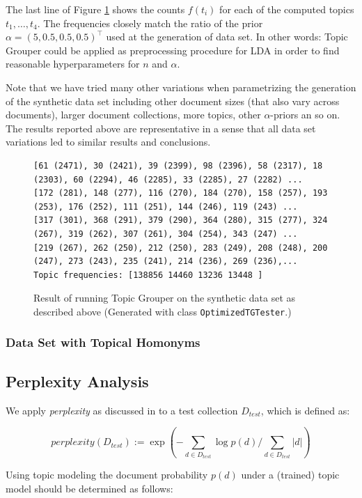 \documentclass[10pt, a4paper, oneside]{article}
\begin{document}
The last line of Figure \ref{tgresult} shows the counts $f(t_i)$ for each of the computed topics $t_1,\ldots,t_4$. The frequencies closely match the ratio of the prior $\alpha = (5, 0.5, 0.5, 0.5)^\top$ used at the generation of data set. In other words: Topic Grouper could be applied as preprocessing procedure for LDA in order to find reasonable hyperparameters for $n$ and $\alpha$.

Note that we have tried many other variations when parametrizing the generation of the synthetic data set including other document sizes (that also vary across documents), larger document collections, more topics, other $\alpha$-priors an so on. The results reported above are representative in a sense that all data set variations led to similar results and conclusions.

\begin{figure}
{\tiny
\begin{verbatim}
[61 (2471), 30 (2421), 39 (2399), 98 (2396), 58 (2317), 18 (2303), 60 (2294), 46 (2285), 33 (2285), 27 (2282) ...
[172 (281), 148 (277), 116 (270), 184 (270), 158 (257), 193 (253), 176 (252), 111 (251), 144 (246), 119 (243) ...
[317 (301), 368 (291), 379 (290), 364 (280), 315 (277), 324 (267), 319 (262), 307 (261), 304 (254), 343 (247) ...
[219 (267), 262 (250), 212 (250), 283 (249), 208 (248), 200 (247), 273 (243), 235 (241), 214 (236), 269 (236),...
Topic frequencies: [138856 14460 13236 13448 ]\end{verbatim}}
\caption{Result of running Topic Grouper on the synthetic data set as described above (Generated with class \texttt{OptimizedTGTester}.)}
\label{tgresult}
\end{figure}

\subsubsection{Data Set with Topical Homonyms}

\subsection{Perplexity Analysis}

We apply \textit{perplexity} as discussed in \cite{Blei:2003:LDA:944919.944937} to a test collection $D_{test}$, which is defined as:

\[ perplexity(D_{test}) := \exp (- \sum_{d \in D_{test}} \log p(d) / \sum_{d \in D_{test}} |d| )\]

Using topic modeling the document probability $p(d)$ under a (trained) topic model should be determined as follows:
\end{document}
